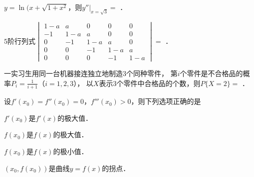 \documentclass[plain,noanswer,medmath]{../../template/jnuexam}
\begin{document}










\begin{problem}
$y = \ln(x + \sqrt{1 + x^2}$，则$y''|_{x = \sqrt{3}} =$ \fillin{}．
\end{problem}


\begin{problem}
$5$阶行列式$\begin{vmatrix}
  1 - a &     a &     0 &     0 & 0 \\
     -1 & 1 - a &     a &     0 & 0 \\
      0 &    -1 & 1 - a &     a & 0 \\
      0 &     0 &    -1 & 1 - a & a \\
      0 &     0 &     0 &    -1 & 1 - a
\end{vmatrix} =$ \fillin{}．
\end{problem}


\begin{problem}
一实习生用同一台机器接连独立地制造$3$个同种零件，
第$i$个零件是不合格品的概率$P_i = \frac{1}{i + 1}$（$i = 1,2,3$），
以$X$表示$3$个零件中合格品的个数，则$P\{X = 2\} =$ \fillin{}．
\end{problem}




\begin{problem}
设$f'(x_0) = f''(x_0) = 0$，$f'''(x_0) > 0$，则下列选项正确的是\pickout{}
\begin{abcd}
\item $f'(x_0)$是$f'(x)$的极大值．	
\item $f(x_0)$是$f(x)$的极大值．
\item $f(x_0)$是$f(x)$的极小值．
\item $(x_0,f(x_0))$是曲线$y = f(x)$的拐点．
\end{abcd}
\end{problem}






\end{document}
